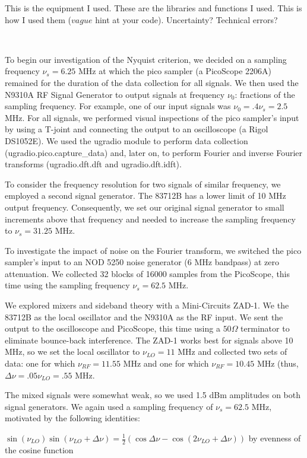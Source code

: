 \documentclass[a4paper]{article}
\begin{document}
\quad \quad This is the equipment I used. These are the libraries and functions I used. This is how I used them ($vague$ hint at your code). Uncertainty? Technical errors?

\

To begin our investigation of the Nyquist criterion, we decided on a sampling frequency $\nu_s = 6.25$ MHz at which the pico sampler (a PicoScope 2206A) remained for the duration of the data collection for all signals. We then used the N9310A RF Signal Generator to output signals at frequency $\nu_0$: fractions of the sampling frequency. For example, one of our input signals was $\nu_0 = .4 \nu_s = 2.5$ MHz. For all signals, we performed visual inspections of the pico sampler's input by using a T-joint and connecting the output to an oscilloscope (a Rigol DS1052E). We used the ugradio module to perform data collection (ugradio.pico.capture\_data) and, later on, to perform Fourier and inverse Fourier transforms (ugradio.dft.dft and ugradio.dft.idft).

To consider the frequency resolution for two signals of similar frequency, we employed a second signal generator. The 83712B has a lower limit of 10 MHz output frequency. Consequently, we set our original signal generator to small increments above that frequency and needed to increase the sampling frequency to $\nu_s = 31.25$ MHz.

To investigate the impact of noise on the Fourier transform, we switched the pico sampler's input to an NOD 5250 noise generator (6 MHz bandpass) at zero attenuation. We collected 32 blocks of 16000 samples from the PicoScope, this time using the sampling frequency $\nu_s = 62.5$ MHz.

We explored mixers and sideband theory with a Mini-Circuits ZAD-1. We the 83712B as the local oscillator and the N9310A as the RF input. We sent the output to the oscilloscope and PicoScope, this time using a $50 \Omega$ terminator to eliminate bounce-back interference. The ZAD-1 works best for signals above 10 MHz, so we set the local oscillator to $\nu_{LO} = 11$ MHz and collected two sets of data: one for which $\nu_{RF} = 11.55$ MHz and one for which $\nu_{RF}=10.45$ MHz (thus, $\Delta \nu = .05 \nu_{LO} = .55$ MHz. 

The mixed signals were somewhat weak, so we used 1.5 dBm amplitudes on both signal generators. We again used a sampling frequency of $\nu_s = 62.5$ MHz, motivated by the following identities:

$\sin(\nu_{LO}) \sin(\nu_{LO} + \Delta \nu) = \frac{1}{2} (\cos \Delta \nu - \cos (2\nu_{LO} + \Delta \nu))$ by evenness of the cosine function
\end{document}
